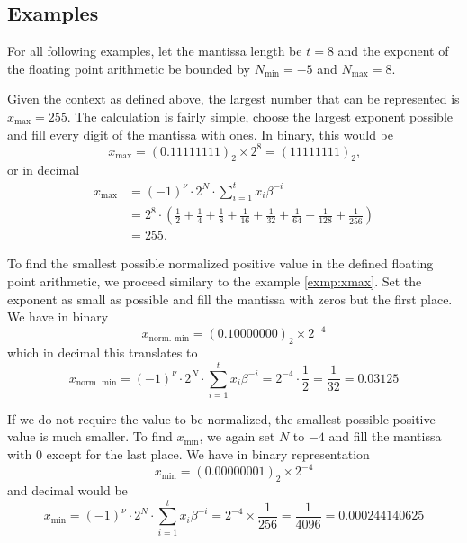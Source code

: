\subsection{Examples}
For all following examples, let the mantissa length be \(t = 8\) and the exponent of the floating point arithmetic be bounded by \(N_{\text{min}} = -5\) and \(N_{\text{max}} = 8\).
%
%
%
\begin{exmp} \label{exmp:xmax}
    Given the context as defined above, the largest number that can be represented is \(x_\text{max} = 255\). The calculation is fairly simple, choose the largest exponent possible and fill every digit of the mantissa with ones. In binary, this would be
    \begin{equation*}
        x_\text{max} = (0.11111111)_2 \times 2^8 = (11111111)_2 \text{,}
    \end{equation*}
    or in decimal
    \begin{align*}
        x_\text{max} &= (-1)^{\nu} \cdot 2^N \cdot \sum_{i=1}^{t}x_i \beta^{-i}\\
        &= 2^8 \cdot \left(\frac{1}{2} + \frac{1}{4} + \frac{1}{8} + \frac{1}{16} + \frac{1}{32} + \frac{1}{64} + \frac{1}{128} + \frac{1}{256}\right) \\
        &= 255 \text{.}
    \end{align*}
\end{exmp}
%
%
\begin{exmp}
    To find the smallest possible normalized positive value in the defined floating point arithmetic, we proceed similary to the example \ref{exmp:xmax}. Set the exponent as small as possible and fill the mantissa with zeros but the first place. We have in binary
    \begin{equation*}
        x_\text{norm. min} = (0.10000000)_2 \times 2^{-4}
    \end{equation*}
    which in decimal this translates to
    \begin{equation*}
        x_\text{norm. min} = (-1)^{\nu} \cdot 2^N \cdot \sum_{i=1}^{t}x_i \beta^{-i} = 2^{-4} \cdot \frac{1}{2} = \frac{1}{32} = 0.03125
    \end{equation*}
\end{exmp}
%
%
\begin{exmp}
    If we do not require the value to be normalized, the smallest possible positive value is much smaller. To find \(x_\text{min}\), we again set \(N\) to \(-4\) and fill the mantissa with \(0\) except for the last place. We have in binary representation
    \begin{equation*}
        x_\text{min} = (0.00000001)_2 \times 2^{-4}
    \end{equation*}
    and decimal would be
    \begin{equation*}
        x_\text{min} = (-1)^{\nu} \cdot 2^N \cdot \sum_{i=1}^{t}x_i \beta^{-i} = 2^{-4} \times \frac{1}{256} = \frac{1}{4096} = 0.000244140625
    \end{equation*}
\end{exmp}
